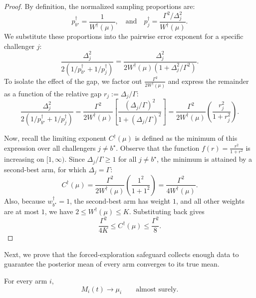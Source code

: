 \documentclass[10pt]{article}
\theoremstyle{plain}
\begin{document}
\begin{proof}
By definition, the normalized sampling proportions are:
$$p_{b^\star}^\dagger=\frac{1}{W^\dagger(\mu)},
\quad\mbox{and}\quad
p_j^\dagger
=
\frac{\Gamma^2/\Delta_j^2}{W^\dagger(\mu)}.$$
We substitute these proportions into the pairwise error exponent for a specific challenger $j$:
$$\frac{
\Delta_j^2
}{
2\left(
1/p_{b^\star}^\dagger+1/p_j^\dagger
\right)
}
=
\frac{
\Delta_j^2
}{
2W^\dagger(\mu)\left(1+\Delta_j^2/\Gamma^2\right)
}.$$
To isolate the effect of the gap, we factor out $\frac{\Gamma^2}{2W^\dagger(\mu)}$ and express the remainder as a function of the relative gap  $r_j := \Delta_j/\Gamma$: $$\frac{
\Delta_j^2
}{
2\left(
1/p_{b^\star}^\dagger+1/p_j^\dagger
\right)
}
=
\frac{\Gamma^2}{2W^\dagger(\mu)}
\left[
\frac{(\Delta_j/\Gamma)^2}
{1+(\Delta_j/\Gamma)^2}
\right]
=
\frac{\Gamma^2}{2W^\dagger(\mu)}
\left(
\frac{r_j^2}{1+r_j^2}
\right).$$

Now, recall the limiting exponent $C^\dagger(\mu)$ is defined as the minimum of this expression over all challengers $j \neq b^\star$. Observe that the function $f(r) = \frac{r^2}{1+r^2}$ is increasing on $[1,\infty)$. Since $\Delta_j/\Gamma\ge1$ for all $j\neq b^\star$, the minimum is attained by
a second-best arm, for which $\Delta_j=\Gamma$:
$$C^\dagger(\mu)
=
\frac{\Gamma^2}{2W^\dagger(\mu)}
\left(
\frac{1^2}{1+1^2}
\right)
=
\frac{\Gamma^2}{4W^\dagger(\mu)}.$$
Also, because $w_{b^\star}^\dagger=1$, the second-best arm has weight $1$, and all other
weights are at most $1$, we have 
$2\le W^\dagger(\mu)\le K$.
Substituting back gives $$\frac{\Gamma^2}{4K}
\le
C^\dagger(\mu)
\le
\frac{\Gamma^2}{8}.  $$ 
\end{proof}





Next, we prove that the forced-exploration safeguard collects enough data to guarantee the posterior mean of every arm converges to its true mean.

\begin{lemma}\label{lem:pgws-posterior-consistency}
For every arm $i$,
\begin{equation}
M_i(t)\to \mu_i    \qquad\text{almost surely}. \label{eqn:Mit_as}
\end{equation}
\end{lemma}
\end{document}
